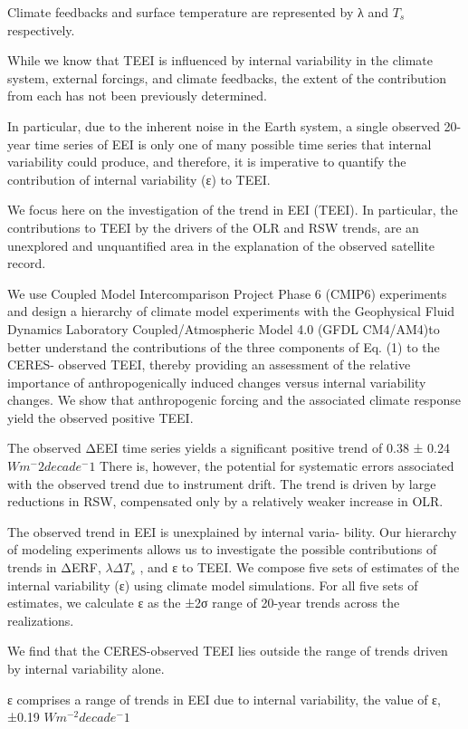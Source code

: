 \documentclass[
]{book}
\begin{document}
Climate feedbacks and surface temperature are represented by
λ and \(T_s\) respectively.

While we know
that TEEI is influenced by internal variability in the climate
system, external forcings, and climate feedbacks, the extent of the
contribution from each has not been previously determined.

In particular, due to the inherent noise in the Earth system, a
single observed 20-year time series of EEI is only one of many
possible time series that internal variability could produce,
and therefore, it is imperative to quantify the contribution of
internal variability (ε) to TEEI.

We focus here on the investigation of the trend in EEI (TEEI).
In particular, the contributions to TEEI by the drivers of the OLR
and RSW trends, are an unexplored and unquantified area in the
explanation of the observed satellite record.

We use Coupled
Model Intercomparison Project Phase 6 (CMIP6) experiments
and design a hierarchy of climate model experiments with the
Geophysical Fluid Dynamics Laboratory Coupled/Atmospheric
Model 4.0 (GFDL CM4/AM4)to better understand the
contributions of the three components of Eq. (1) to the CERES-
observed TEEI, thereby providing an assessment of the relative
importance of anthropogenically induced changes versus internal
variability changes. We show that anthropogenic forcing and the
associated climate response yield the observed positive TEEI.

The observed ΔEEI time series
yields a significant positive trend of 0.38 ± 0.24 \(Wm^-2 decade^-1\)
There is, however, the potential for systematic
errors associated with the observed trend due to instrument drift.
The trend is driven by large reductions in RSW,
compensated only by a relatively weaker increase in OLR.

The observed trend in EEI is unexplained by internal varia-
bility. Our hierarchy of modeling experiments allows us to
investigate the possible contributions of trends in ΔERF, \(λΔT_s\) ,
and ε to TEEI. We compose five sets of estimates of the internal
variability (ε) using climate model simulations. For all five sets of
estimates, we calculate ε as the ±2σ range of 20-year trends across
the realizations.

We find that the CERES-observed TEEI lies outside the range
of trends driven by internal variability alone.

ε comprises a range of trends in EEI due to internal
variability, the value of ε, ±0.19 \(Wm^{-2} decade^−1\)
\end{document}
